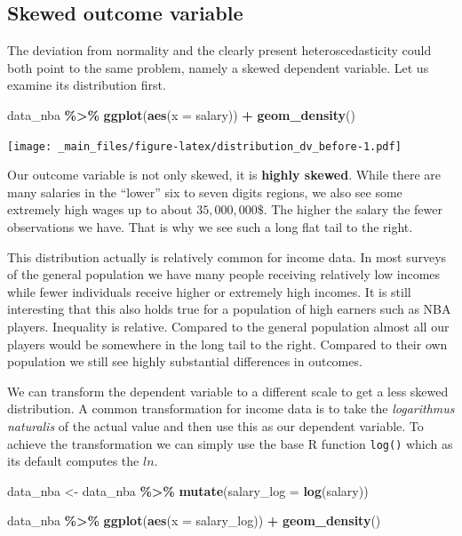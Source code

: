 \documentclass[
]{book}
\newenvironment{Shaded}{\begin{snugshade}}{\end{snugshade}}
\newcommand{\AttributeTok}[1]{\textcolor[rgb]{0.13,0.29,0.53}{#1}}
\newcommand{\FunctionTok}[1]{\textcolor[rgb]{0.13,0.29,0.53}{\textbf{#1}}}
\newcommand{\NormalTok}[1]{#1}
\newcommand{\OtherTok}[1]{\textcolor[rgb]{0.56,0.35,0.01}{#1}}
\newcommand{\SpecialCharTok}[1]{\textcolor[rgb]{0.81,0.36,0.00}{\textbf{#1}}}
\begin{document}
\hypertarget{skewed-outcome-variable}{%
\subsection{Skewed outcome variable}\label{skewed-outcome-variable}}

The deviation from normality and the clearly present heteroscedasticity could
both point to the same problem, namely a skewed dependent variable. Let us
examine its distribution first.

\begin{Shaded}
\begin{Highlighting}[]
\NormalTok{data\_nba }\SpecialCharTok{\%\textgreater{}\%} 
  \FunctionTok{ggplot}\NormalTok{(}\FunctionTok{aes}\NormalTok{(}\AttributeTok{x =}\NormalTok{ salary)) }\SpecialCharTok{+}
  \FunctionTok{geom\_density}\NormalTok{()}
\end{Highlighting}
\end{Shaded}

\texttt{[image: \_main\_files/figure-latex/distribution\_dv\_before-1.pdf]}

Our outcome variable is not only skewed, it is \textbf{highly skewed}. While there
are many salaries in the ``lower'' six to seven digits regions, we also see some
extremely high wages up to about \(35,000,000\$\). The higher the salary the fewer
observations we have. That is why we see such a long flat tail to the right.

This distribution actually is relatively common for income data. In most surveys
of the general population we have many people receiving relatively low incomes
while fewer individuals receive higher or extremely high incomes. It is still
interesting that this also holds true for a population of high earners such as
NBA players. Inequality is relative. Compared to the general
population almost all our players would be somewhere in the long tail to the
right. Compared to their own population we still see highly substantial
differences in outcomes.

We can transform the dependent variable to a different scale to get a less
skewed distribution. A common transformation for income data is to take the
\emph{logarithmus naturalis} of the actual value and then use this as our
dependent variable. To achieve the transformation we can simply use the base R
function \texttt{log()} which as its default computes the \(ln\).

\begin{Shaded}
\begin{Highlighting}[]
\NormalTok{data\_nba }\OtherTok{\textless{}{-}}\NormalTok{ data\_nba }\SpecialCharTok{\%\textgreater{}\%} 
  \FunctionTok{mutate}\NormalTok{(}\AttributeTok{salary\_log =} \FunctionTok{log}\NormalTok{(salary))}

\NormalTok{data\_nba }\SpecialCharTok{\%\textgreater{}\%} 
  \FunctionTok{ggplot}\NormalTok{(}\FunctionTok{aes}\NormalTok{(}\AttributeTok{x =}\NormalTok{ salary\_log)) }\SpecialCharTok{+}
  \FunctionTok{geom\_density}\NormalTok{()}
\end{Highlighting}
\end{Shaded}
\end{document}
